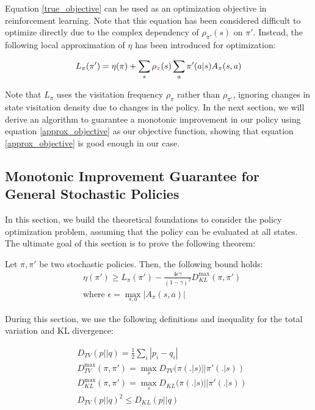 Equation \ref{true_objective} can be used as an optimization objective in reinforcement learning. Note that this equation has been considered difficult to optimize directly due to the complex dependency of $\rho_{\pi'}(s)$ on $\pi'$. Instead, the following local approximation of $\eta$ has been introduced for optimization:

\begin{align}\label{approx_objective}
    L_{\pi}(\pi') = \eta(\pi) + \sum_{s}\rho_{\textcolor{red}{\pi}}(s)\sum_{a}\pi'(a|s)A_{\pi}(s, a)
\end{align}

Note that $L_{\pi}$ uses the visitation frequency $\rho_{\pi}$ rather than $\rho_{\pi'}$, ignoring changes in state visitation density due to changes in the policy. In the next section, we will derive an algorithm to guarantee a monotonic improvement in our policy using equation \ref{approx_objective} as our objective function, showing that equation \ref{approx_objective} is good enough in our case.

\subsection{Monotonic Improvement Guarantee for General Stochastic Policies}

In this section, we build the theoretical foundations to consider the policy optimization problem, assuming that the policy can be evaluated at all states. The ultimate goal of this section is to prove the following theorem:

\begin{theorem}\label{thm:policy-bound}
    Let $\pi, \pi'$ be two stochastic policies. Then, the following bound holds:
    \begin{align*}
    &\eta(\pi') \ge L_{\pi}(\pi') - \frac{4\epsilon\gamma}{(1-\gamma)^2}D_{KL}^{\max}(\pi, \pi') \\
    &\text{where } \epsilon = \max_{s, a} |A_{\pi}(s, a)|
    \end{align*}
\end{theorem}

During this section, we use the following definitions and inequality for the total variation and KL divergence:

\begin{align*}
    &D_{TV}(p||q) = \frac{1}{2}\sum_{i}|p_i - q_i| \\
    &D_{TV}^{\max}(\pi, \pi') = \max_{s} D_{TV}(\pi(.|s)||\pi'(.|s))\\
    &D_{KL}^{\max}(\pi, \pi') = \max_{s} D_{KL}(\pi(.|s)||\pi'(.|s))\\
    &D_{TV}(p||q)^2 \le D_{KL}(p||q)
\end{align*}

